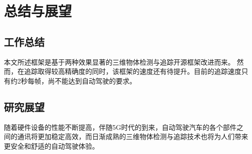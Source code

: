 
\chapter{总结与展望}
\section{工作总结}
\indent 本文所述框架是基于两种效果显著的三维物体检测与追踪开源框架改进而来。
\indent 然而，在追踪取得较高精确度的同时，该框架的速度还有待提升。目前的追踪速度只有约2秒每帧，尚不能达到自动驾驶的要求。
\section{研究展望}
\indent 随着硬件设备的性能不断提高，伴随5G时代的到来，自动驾驶汽车的各个部件之间的通讯将更加稳定高效，而日渐成熟的三维物体检测与追踪技术也将为人们带来更安全和舒适的自动驾驶体验。